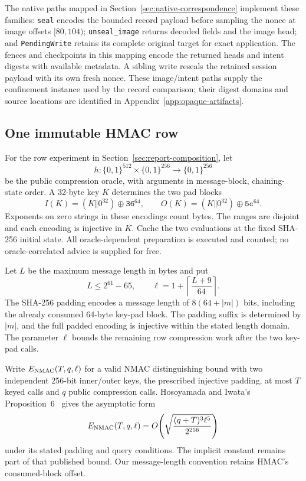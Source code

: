 The native paths mapped in Section~\ref{sec:native-correspondence} implement
these families: \texttt{seal} encodes the bounded record payload before
sampling the nonce at image offsets $[80,104)$; \texttt{unseal\_image}
returns decoded fields and the image head; and \texttt{PendingWrite}
retains its complete original target for exact application. The fences
and checkpoints in this mapping encode the returned heads and intent digests with
available metadata. A sibling write reseals the retained session payload
with its own fresh nonce. These image/intent paths supply the confinement
instance used by the record comparison; their digest domains and source
locations are identified in Appendix~\ref{app:opaque-artifacts}.

\subsection{One immutable HMAC row}

For the row experiment in Section~\ref{sec:report-composition}, let
\[
 h:\{0,1\}^{512}\times\{0,1\}^{256}\longrightarrow\{0,1\}^{256}
\]
be the public compression oracle, with arguments in message-block,
chaining-state order. A 32-byte key $K$ determines the two pad blocks
\[
 I(K)=(K\Vert0^{32})\oplus\mathtt{36}^{64},\qquad
 O(K)=(K\Vert0^{32})\oplus\mathtt{5c}^{64}.
\]
Exponents on zero strings in these encodings count bytes. The ranges are disjoint and
each encoding is injective in $K$. Cache the two evaluations at the fixed
SHA-256 initial state. All oracle-dependent preparation is executed and
counted; no oracle-correlated advice is supplied for free.

Let $L$ be the maximum message length in bytes and put
\[
 L\le2^{61}-65,\qquad
 \ell=1+\left\lceil\frac{L+9}{64}\right\rceil.
\]
The SHA-256 padding encodes a message length of $8(64+|m|)$ bits, including
the already consumed 64-byte key-pad block. The padding suffix is determined by $|m|$, and the
full padded encoding is injective within the stated length domain.
The parameter $\ell$ bounds the remaining
row compression work after the two key-pad calls.

Write $E_{\rm NMAC}(T,q,\ell)$ for a valid NMAC distinguishing bound with two
independent 256-bit inner/outer keys, the prescribed injective padding, at
most $T$ keyed calls and $q$ public compression calls. Hosoyamada and Iwata's
Proposition~6~\cite{hmacqrom2021} gives the asymptotic form
\[
 E_{\rm NMAC}(T,q,\ell)
 =O\!\left(\sqrt{\frac{(q+T)^3\ell^5}{2^{256}}}\right)
\]
under its stated padding and query conditions. The implicit constant remains
part of that published bound. Our message-length convention retains HMAC's
consumed-block offset.

